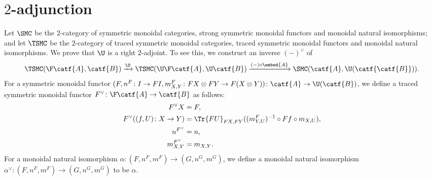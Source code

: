 
\section{\(2\)-adjunction}
\label{2-adjunction}

Let \(\SMC\) be the \(2\)-category of symmetric monoidal categories,
strong symmetric monoidal functors and monoidal natural
isomorphisms; and let \(\TSMC\) be the \(2\)-category of traced
symmetric monoidal categories, traced symmetric monoidal functors and
monoidal natural isomorphisms. We prove that
\(\U\) is a right \(2\)-adjoint. To see this, we construct
an inverse \((-)^{\vee}\) of
\begin{equation*}
  \TSMC(\F\catf{A},\catf{B}) \xrightarrow{\U}
  \TSMC(\U\F\catf{A},\U\catf{B}) \xrightarrow{(-) \circ \embed{A}}
  \SMC(\catf{A},\U(\catf{\catf{B}})).
\end{equation*}
For a symmetric monoidal functor \((F,n^{F} \colon I \to FI,
m^{F}_{X,Y} \colon FX \otimes FY \to F(X \otimes Y)) \colon \catf{A} \to \U(\catf{B})\),
we define a traced symmetric monoidal functor \(F^{\vee} \colon \F\catf{A} \to \catf{B}\)
as follows:
\begin{align*}
  F^{\vee}X &= F, \\
  F^{\vee}((f,U) \colon X \to Y)
  &= \Tr{FU}_{FX,FY}((m_{Y,U}^{F})^{-1} \circ Ff \circ m_{X,U}), \\
  n^{F^{\vee}} &= n, \\
  m^{F^{\vee}}_{X,Y} &= m_{X,Y}.
\end{align*}
For a monoidal natural isomorphism \(\alpha \colon (F,n^{F},m^{F}) \to
(G,n^{G},m^{G})\), we define a monoidal natural isomorphism
\(\alpha^{\vee} \colon (F,n^{F},m^{F}) \to
(G,n^{G},m^{G})\) to be \(\alpha\).

